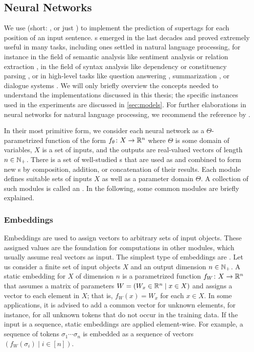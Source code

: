 \documentclass[../document.tex]{subfiles}
\begin{document}
    \subsection{Neural Networks}\label{sec:preliminaries:nn}
    We use  (short: , or just ) to implement the prediction of supertags for each position of an input sentence.
    s emerged in the last decades and proved extremely useful in many tasks, including ones settled in natural language processing, for instance in the field of semantic analysis like sentiment analysis \citep{sentiment} or relation extraction \citep{relationextraction}, in the field of syntax analysis like dependency \citep{dependencyparsing} or constituency parsing \citep{FerGom20a}, or in high-level tasks like question answering \citep{Devlin2019}, summarization \citep{bertgeneration}, or dialogue systems \citep{dialoguesystems}.
    We will only briefly overview the concepts needed to understand the implementations discussed in this thesis; the specific instances used in the experiments are discussed in \cref{sec:models}.
    For further elaborations in neural networks for natural language processing, we recommend the reference by \citet{Gol22}.

    In their most primitive form, we consider each neural network as a \(\varTheta\)-parametrized function of the form \(f_\theta\colon X \to \mathbb{R}^n\) where \(\varTheta\) is some domain of variables, \(X\) is a set of inputs, and the outputs are real-valued vectors of length \(n \in \mathbb{N}_+\).
    There is a set of well-studied s that are used as  and combined to form new s by composition, addition, or concatenation of their results.
    Each module defines suitable sets of inputs \(X\) as well as a parameter domain \(\varTheta\). 
    A collection of such modules is called an .
    In the following, some common modules are briefly explained.

    \subsubsection{Embeddings}
    Embeddings are used to assign vectors to arbitrary sets of input objects.
    These assigned values are the foundation for computations in other modules, which usually assume real vectors as input.
    The simplest type of embeddings are .
    Let us consider a finite set of input objects \(X\) and an output dimension \(n \in \mathbb{N}_+\).
    A static embedding for \(X\) of dimension \(n\) is a parametrized function \(f_W\colon X \to \mathbb{R}^n\) that assumes a matrix of parameters \(W = (W_x \in \mathbb{R}^n \mid x \in X)\) and assigns a vector to each element in \(X\); that is, \(f_W(x) = W_{x}\) for each \(x \in X\).
    In some applications, it is advised to add a common vector for unknown elements, for instance, for all unknown tokens that do not occur in the training data.
    If the input is a sequence, static embeddings are applied element-wise.
    For example, a sequence of tokens \(\sigma_1 \cdots \sigma_n\) is embedded as a sequence of vectors \((f_W(\sigma_i) \mid i \in [n])\).
\end{document}
